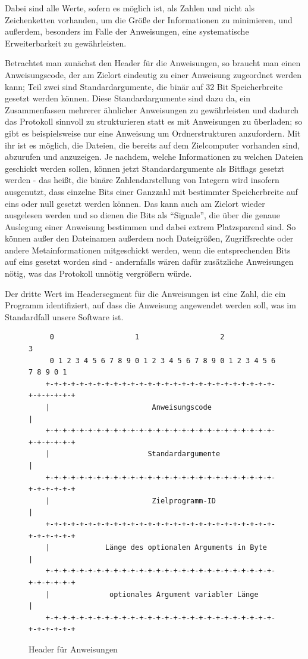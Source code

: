 Dabei sind alle Werte, sofern es möglich ist, als Zahlen und nicht als Zeichenketten vorhanden, um die Größe der Informationen zu minimieren, und außerdem, besonders im Falle der Anweisungen, eine systematische Erweiterbarkeit zu gewährleisten.\\\par
Betrachtet man zunächst den Header für die Anweisungen, so braucht man einen Anweisungscode, der am Zielort eindeutig zu einer Anweisung zugeordnet werden kann; Teil zwei sind Standardargumente, die binär auf 32 Bit Speicherbreite gesetzt werden können.
Diese Standardargumente sind dazu da, ein Zusammenfassen mehrerer ähnlicher Anweisungen zu gewährleisten und dadurch das Protokoll sinnvoll zu strukturieren statt es mit Anweisungen zu überladen; so gibt es beispielsweise nur eine Anweisung um Ordnerstrukturen anzufordern.  
Mit ihr ist es möglich, die Dateien, die bereits auf dem Zielcomputer vorhanden sind, abzurufen und anzuzeigen. 
Je nachdem, welche Informationen zu welchen Dateien geschickt werden sollen, können jetzt Standardargumente als Bitflags gesetzt werden -  das heißt, die binäre Zahlendarstellung von Integern wird insofern ausgenutzt, dass einzelne Bits einer Ganzzahl mit bestimmter Speicherbreite auf eins oder null gesetzt werden können. Das kann auch am Zielort wieder ausgelesen werden und so dienen die Bits als "`Signale"', die über die genaue Auslegung einer Anweisung bestimmen und dabei extrem Platzsparend sind.
So können außer den Dateinamen außerdem noch Dateigrößen, Zugriffsrechte oder andere Metainformationen mitgeschickt werden, wenn die entsprechenden Bits auf eins gesetzt worden sind - andernfalls wären dafür zusätzliche Anweisungen nötig, was das Protokoll unnötig vergrößern würde.\par 
Der dritte Wert im Headersegment für die Anweisungen ist eine Zahl, die ein Programm identifiziert, auf dass die Anweisung angewendet werden soll, was im Standardfall unsere Software ist.

\begin{figure}[h]
\begin{lstlisting}
     0                   1                   2                   3
     0 1 2 3 4 5 6 7 8 9 0 1 2 3 4 5 6 7 8 9 0 1 2 3 4 5 6 7 8 9 0 1
    +-+-+-+-+-+-+-+-+-+-+-+-+-+-+-+-+-+-+-+-+-+-+-+-+-+-+-+-+-+-+-+-+
    |                        Anweisungscode                         |
    +-+-+-+-+-+-+-+-+-+-+-+-+-+-+-+-+-+-+-+-+-+-+-+-+-+-+-+-+-+-+-+-+
    |                       Standardargumente                       |
    +-+-+-+-+-+-+-+-+-+-+-+-+-+-+-+-+-+-+-+-+-+-+-+-+-+-+-+-+-+-+-+-+
    |                        Zielprogramm-ID                        |
    +-+-+-+-+-+-+-+-+-+-+-+-+-+-+-+-+-+-+-+-+-+-+-+-+-+-+-+-+-+-+-+-+
    |             Länge des optionalen Arguments in Byte            |
    +-+-+-+-+-+-+-+-+-+-+-+-+-+-+-+-+-+-+-+-+-+-+-+-+-+-+-+-+-+-+-+-+
    |              optionales Argument variabler Länge              |
    +-+-+-+-+-+-+-+-+-+-+-+-+-+-+-+-+-+-+-+-+-+-+-+-+-+-+-+-+-+-+-+-+
\end{lstlisting}
\caption{Header für Anweisungen}
\label{Anweisungs_Header}
\end{figure}

